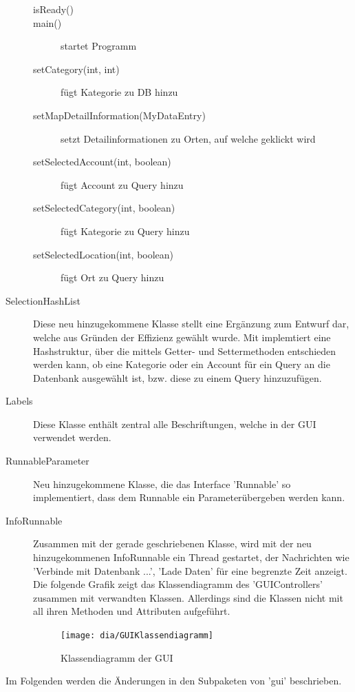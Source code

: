\begin{description}
\begin{description}
			\item[isReady()]
			\item[main()] startet Programm
			\item[setCategory(int, int)] fügt Kategorie zu DB hinzu
			\item[setMapDetailInformation(MyDataEntry)] setzt Detailinformationen zu Orten, auf welche geklickt wird
			\item[setSelectedAccount(int, boolean)] fügt Account zu Query hinzu
			\item[setSelectedCategory(int, boolean)] fügt Kategorie zu Query hinzu
			\item[setSelectedLocation(int, boolean)] fügt Ort zu Query hinzu
		\end{description}
		\item [SelectionHashList]
		\quad
		Diese neu hinzugekommene Klasse stellt  eine Ergänzung zum Entwurf dar, welche aus Gründen der Effizienz gewählt wurde. Mit implemtiert eine Hashstruktur, über die mittels Getter- und Settermethoden entschieden werden kann, ob eine Kategorie oder ein Account für ein Query an die Datenbank ausgewählt ist, bzw. diese zu einem Query hinzuzufügen.
		\item [Labels] 
		\quad
		Diese Klasse enthält zentral alle Beschriftungen, welche in der GUI verwendet werden.
		\item [RunnableParameter] 
		\quad 
		Neu hinzugekommene Klasse, die das Interface 'Runnable' so implementiert, dass dem Runnable ein Parameterübergeben werden kann.
		\item[InfoRunnable] 
		\quad
		Zusammen mit der gerade geschriebenen Klasse, wird mit der neu hinzugekommenen InfoRunnable ein Thread gestartet, der Nachrichten wie 'Verbinde mit Datenbank ...', 'Lade Daten' für eine begrenzte Zeit anzeigt.	
		Die folgende Grafik zeigt das Klassendiagramm des 'GUIControllers' zusammen mit verwandten Klassen. Allerdings sind die Klassen nicht mit all ihren Methoden und Attributen aufgeführt.
		\begin{figure}[h!]
			\centering
			\texttt{[image: dia/GUIKlassendiagramm]}
			\caption{Klassendiagramm der GUI}
			\label{fig:GUI}
		\end{figure}
	\end{description}
		Im Folgenden werden die Änderungen in den Subpaketen von 'gui' beschrieben.

